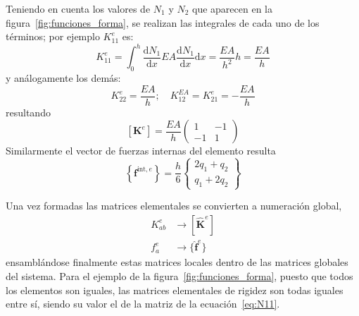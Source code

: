 Teniendo en cuenta los valores de $N_1$ y $N_2$ que aparecen en la figura~\ref{fig:funciones_forma}, se realizan las integrales de cada uno de los términos; por ejemplo $K_{11}^{e}$ es:
\begin{equation}
K_{11}^{e}=\int_{0}^{h} \frac{\mathrm{d} N_{1}}{\mathrm{d} x} EA \frac{\mathrm{d} N_{1}}{\mathrm{d} x} \mathrm{d} x=\frac{EA}{h^{2}} h=\frac{EA}{h}
\end{equation}\label{eq:N9}
y análogamente los demás:
\begin{equation}
K_{22}^{e}=\frac{EA}{h} ; \quad K_{12}^{EA}=K_{21}^{e}=-\frac{EA}{h}
\end{equation}\label{eq:N10}
resultando
\begin{equation}
\left[\mathbf{K}^{e}\right]=\frac{EA}{h}\left(\begin{array}{cc}{1} & {-1} \\ {-1} & {1}\end{array}\right)
\end{equation}\label{eq:N11}
Similarmente el vector de fuerzas internas del elemento resulta
\begin{equation}
\left\{\mathbf{f}^{\mathrm{int}, e}\right\}=\frac{h}{6}\left\{\begin{array}{l}{2q_1+q_2} \\ {q_1 + 2q_2}\end{array}\right\}
\end{equation}\label{eq:N12}


Una vez formadas las matrices elementales se convierten a
numeración global,
\begin{eqnarray}
K_{a b}^{e} & \rightarrow\left[\hat{\mathbf{K}}^{e}\right] \nonumber
 \\
f_{a}^{e} & \rightarrow \lbrace\hat{\mathbf{f}}^{e}\rbrace \nonumber
\end{eqnarray}
ensamblándose finalmente estas matrices locales dentro de las matrices globales del sistema. Para el ejemplo de la figura~\ref{fig:funciones_forma}, puesto que todos los elementos son iguales, las matrices elementales de rigidez son todas iguales entre sí, siendo su valor el de la matriz de la ecuación~\eqref{eq:N11}.

